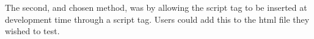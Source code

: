 The second, and chosen method, was by allowing the script tag to be inserted
at development time through a script tag. Users could add this to the html
file they wished to test.


%
%
%
%
